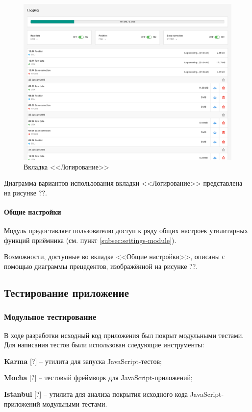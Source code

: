 \begin{figure}[h!]
  \centering
  \setlength{\fboxsep}{5pt}
  \includegraphics[width=.8\textwidth]{img/reachview/logging_content_laptop}
  \vspace*{6pt}
  \caption{Вкладка <<Логирование>>}
  \label{fig:logging}
\end{figure}

Диаграмма вариантов использования вкладки <<Логирование>> представлена на рисунке ??.

\paragraph{Общие настройки}

Модуль предоставляет пользователю доступ к ряду общих настроек  утилитарных функций приёмника (см. пункт \ref{subsec:settings-module}).

Возможности, доступные во вкладке <<Общие настройки>>, описаны с помощью диаграммы прецедентов, изображённой на рисунке ??.



\subsection{Тестирование приложение}


\subsubsection{Модульное тестирование}

В ходе разработки исходный код приложения был покрыт модульными тестами. Для написания тестов были использован следующие инструменты:
\begin{dashitemize}
  \item \textbf{Karma} [?] -- утилита для запуска JavaScript-тестов;
  \item \textbf{Mocha} [?] -- тестовый фреймворк для JavaScript-приложений;
  \item \textbf{Istanbul} [?] -- утилита для анализа покрытия исходного кода JavaScript-приложений модульными тестами.
\end{dashitemize}

